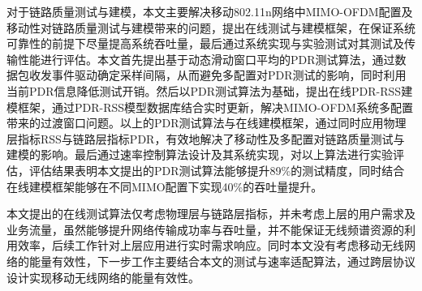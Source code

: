 对于链路质量测试与建模，本文主要解决移动802.11n网络中MIMO-OFDM配置及移动性对链路质量测试与建模带来的问题，提出在线测试与建模框架，在保证系统可靠性的前提下尽量提高系统吞吐量，最后通过系统实现与实验测试对其测试及传输性能进行评估。本文首先提出基于动态滑动窗口平均的PDR测试算法，通过数据包收发事件驱动确定采样间隔，从而避免多配置对PDR测试的影响，同时利用当前PDR信息降低测试开销。然后以PDR测试算法为基础，提出在线PDR-RSS建模框架，通过PDR-RSS模型数据库结合实时更新，解决MIMO-OFDM系统多配置带来的过渡窗口问题。以上的PDR测试算法与在线建模框架，通过同时应用物理层指标RSS与链路层指标PDR，有效地解决了移动性及多配置对链路质量测试与建模的影响。最后通过速率控制算法设计及其系统实现，对以上算法进行实验评估，评估结果表明本文提出的PDR测试算法能够提升89\%的测试精度，同时结合在线建模框架能够在不同MIMO配置下实现40\%的吞吐量提升。

本文提出的在线测试算法仅考虑物理层与链路层指标，并未考虑上层的用户需求及业务流量，虽然能够提升网络传输成功率与吞吐量，并不能保证无线频谱资源的利用效率，后续工作针对上层应用进行实时需求响应。同时本文没有考虑移动无线网络的能量有效性，下一步工作主要结合本文的测试与速率适配算法，通过跨层协议设计实现移动无线网络的能量有效性。


